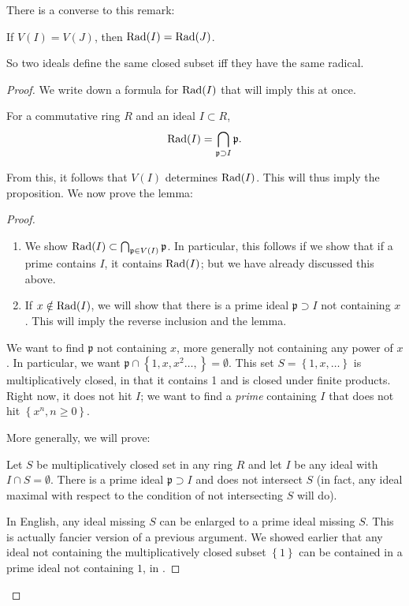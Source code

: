 There is a converse to this remark:
\begin{proposition} 
If $V(I) = V(J)$, then $\operatorname{Rad}(I) = \operatorname{Rad}(J)$. 
\end{proposition} 
So two ideals define the same closed subset iff they have the
same radical.
\begin{proof} 
We write down a formula for $\operatorname{Rad}(I)$ that will imply this at
once.
\begin{lemma} \label{radprimescontaining} For a commutative ring $R$ and an
ideal $I \subset
R$,
\[ \operatorname{Rad}(I) = \bigcap_{\mathfrak{p} \supset I} \mathfrak{p}.  \]
\end{lemma} 
From this, it follows that $V(I)$ determines $\operatorname{Rad}(I)$. This
will thus imply
the proposition.  
We now prove the lemma:
\begin{proof} 
\begin{enumerate}
\item We show $\operatorname{Rad}(I) \subset \bigcap_{\mathfrak{p} \in V(I)}
\mathfrak{p} $. In
particular, this follows if we show that if a prime contains
$I$, it contains $\operatorname{Rad}(I)$; but we have already
discussed this above.  
\item If $x \notin \operatorname{Rad}(I)$, we will show that there is a prime
ideal $\mathfrak{p}
\supset I$ not containing $x$. This will imply the reverse
inclusion and the
lemma.  
\end{enumerate}


We want to find $\mathfrak{p}$ not containing $x$, more
generally not
containing any power of $x$. In particular, we want
$\mathfrak{p} \cap \left\{1,
x, x^2 \dots, \right\} = \emptyset$. This set $S = \left\{1, x,
\dots\right\}$
is multiplicatively closed, in that it contains 1 and is closed
under
finite products. Right now, it does not hit $I$; we want to find
a
\emph{prime} containing $I$ that does not hit $\left\{x^n, n
\geq 0\right\}$.


More generally, we will prove:

\begin{sublemma}\label{sublemmamultclosed}
Let $S$ be multiplicatively closed set in any ring $R$ and let
$I$ be any ideal with $I \cap S =
\emptyset$. There is a prime ideal $\mathfrak{p} \supset I$ and
does not
intersect $S$ (in fact, any ideal maximal with respect to the condition of
not intersecting $S$ will do).  
\end{sublemma}
In English, any ideal missing $S$ can be enlarged to a prime
ideal missing $S$.
This is actually fancier version of a previous argument. We
showed earlier that any ideal not
containing the multiplicatively closed subset $\left\{1\right\}$
can be
contained in a prime ideal not containing $1$, in
.


\end{proof}
\end{proof}
